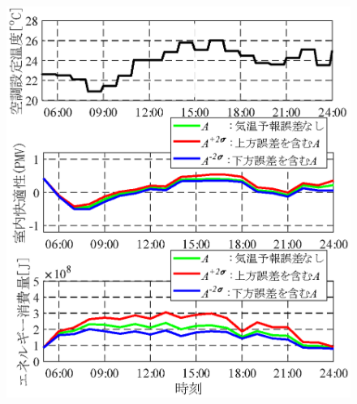 \begin{figure}[htbp]
  \begin{center}
    \begin{minipage}{0.7\textwidth}
      \begin{center}
        \includegraphics[width=1\textwidth,keepaspectratio=true]{fig/surrogate_result_schedule_robust_2obj.eps}\\\vspace{-5mm}{\small スケジュール X (ロバスト性を考慮しない2目的最適化で得た解)}
      \end{center}
    \end{minipage}
    \\
    \begin{minipage}{0.7\textwidth}
      \begin{center}

\end{center}
\end{minipage}
\end{center}
\end{figure}
